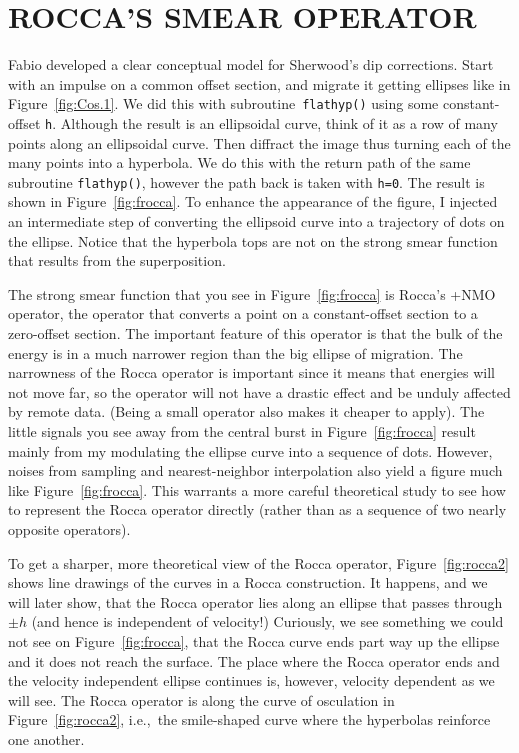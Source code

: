 \section{ROCCA'S SMEAR OPERATOR}
Fabio  developed
a clear conceptual model for Sherwood's dip corrections.
Start with an impulse on a common offset section,
and migrate it getting ellipses like in Figure~\ref{fig:Cos.1}.
We did this with subroutine~\texttt{flathyp()} 
using some constant-offset  {\tt h}.
Although the result is an ellipsoidal curve,
think of it as a row of many points along an ellipsoidal curve.
Then diffract the image
thus turning each of the many points into a hyperbola.
We do this with the return path of the same subroutine {\tt flathyp()},
however the path back is taken with {\tt h=0}.
The result is shown in Figure~\ref{fig:frocca}.
To enhance the appearance of the figure,
I injected an intermediate step of converting the ellipsoid
curve into a trajectory of dots on the ellipse.
Notice that the hyperbola tops
are not on the strong smear function that results
from the superposition.

\par
The strong smear function that you see in Figure~\ref{fig:frocca}
is Rocca's +NMO operator,
the operator that converts a point on a constant-offset section
to a zero-offset section.
The important feature of this operator is that
the bulk of the energy is in a much narrower region
than the big ellipse of migration.
The narrowness of the Rocca operator is important
since it means that energies will not move far,
so the operator will not have a drastic effect
and be unduly affected by remote data.
(Being a small operator also makes it cheaper to apply).
The little signals you see away from the central burst
in Figure~\ref{fig:frocca} result mainly from
my modulating the ellipse curve into a sequence of dots.
However, noises from sampling and nearest-neighbor interpolation
also yield a figure much like Figure~\ref{fig:frocca}.
This warrants a more careful theoretical study
to see how to represent the Rocca operator
directly (rather than as a sequence of two nearly opposite operators).
\newslide
\par
To get a sharper, more theoretical view of the Rocca operator,
Figure~\ref{fig:rocca2} shows line drawings of the curves in
a Rocca construction.
It happens, and we will later show,
that the Rocca operator lies along an ellipse
that passes through $\pm h$
(and hence is independent of velocity!)
Curiously,
we see something we could not see on Figure~\ref{fig:frocca},
that the Rocca curve ends part way up the ellipse
and it does not reach the surface.
The place where the Rocca operator ends
and the velocity independent ellipse continues is, however,
velocity dependent as we will see.
The Rocca operator is along the curve of osculation in Figure~\ref{fig:rocca2},
i.e.,~the smile-shaped curve where the hyperbolas reinforce one another.
\newslide

